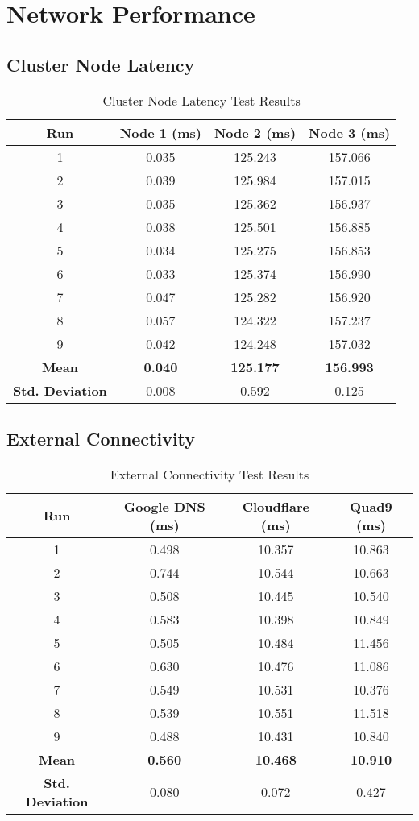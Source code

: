 \section{Network Performance}

\subsection{Cluster Node Latency}
\begin{table}[H]
\centering
\begin{tabular}{|c|c|c|c|}
\hline
\textbf{Run} & \textbf{Node 1 (ms)} & \textbf{Node 2 (ms)} & \textbf{Node 3 (ms)} \\
\hline
1 & 0.035 & 125.243 & 157.066 \\
2 & 0.039 & 125.984 & 157.015 \\
3 & 0.035 & 125.362 & 156.937 \\
4 & 0.038 & 125.501 & 156.885 \\
5 & 0.034 & 125.275 & 156.853 \\
6 & 0.033 & 125.374 & 156.990 \\
7 & 0.047 & 125.282 & 156.920 \\
8 & 0.057 & 124.322 & 157.237 \\
9 & 0.042 & 124.248 & 157.032 \\
\hline
\textbf{Mean} & \textbf{0.040} & \textbf{125.177} & \textbf{156.993} \\
\textbf{Std. Deviation} & 0.008 & 0.592 & 0.125 \\
\hline
\end{tabular}
\caption{Cluster Node Latency Test Results}
\end{table}

\subsection{External Connectivity}
\begin{table}[H]
\centering
\begin{tabular}{|c|c|c|c|}
\hline
\textbf{Run} & \textbf{Google DNS (ms)} & \textbf{Cloudflare (ms)} & \textbf{Quad9 (ms)} \\
\hline
1 & 0.498 & 10.357 & 10.863 \\
2 & 0.744 & 10.544 & 10.663 \\
3 & 0.508 & 10.445 & 10.540 \\
4 & 0.583 & 10.398 & 10.849 \\
5 & 0.505 & 10.484 & 11.456 \\
6 & 0.630 & 10.476 & 11.086 \\
7 & 0.549 & 10.531 & 10.376 \\
8 & 0.539 & 10.551 & 11.518 \\
9 & 0.488 & 10.431 & 10.840 \\
\hline
\textbf{Mean} & \textbf{0.560} & \textbf{10.468} & \textbf{10.910} \\
\textbf{Std. Deviation} & 0.080 & 0.072 & 0.427 \\
\hline
\end{tabular}
\caption{External Connectivity Test Results}
\end{table}

